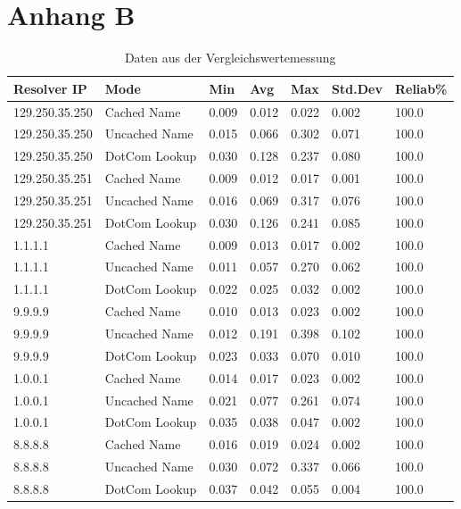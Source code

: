 \chapter{Anhang B}
\label{chap:appB}

\begin{table}[]
\caption{Daten aus der Vergleichswertemessung}
\begin{tabular}{lllllll}
\hline
Resolver IP    & Mode          & Min   & Avg   & Max   & Std.Dev & Reliab\% \\ \hline
129.250.35.250 & Cached Name   & 0.009 & 0.012 & 0.022 & 0.002   & 100.0    \\
129.250.35.250 & Uncached Name & 0.015 & 0.066 & 0.302 & 0.071   & 100.0    \\
129.250.35.250 & DotCom Lookup & 0.030 & 0.128 & 0.237 & 0.080   & 100.0    \\
129.250.35.251 & Cached Name   & 0.009 & 0.012 & 0.017 & 0.001   & 100.0    \\
129.250.35.251 & Uncached Name & 0.016 & 0.069 & 0.317 & 0.076   & 100.0    \\
129.250.35.251 & DotCom Lookup & 0.030 & 0.126 & 0.241 & 0.085   & 100.0    \\
1.1.1.1        & Cached Name   & 0.009 & 0.013 & 0.017 & 0.002   & 100.0    \\
1.1.1.1        & Uncached Name & 0.011 & 0.057 & 0.270 & 0.062   & 100.0    \\
1.1.1.1        & DotCom Lookup & 0.022 & 0.025 & 0.032 & 0.002   & 100.0    \\
9.9.9.9        & Cached Name   & 0.010 & 0.013 & 0.023 & 0.002   & 100.0    \\
9.9.9.9        & Uncached Name & 0.012 & 0.191 & 0.398 & 0.102   & 100.0    \\
9.9.9.9        & DotCom Lookup & 0.023 & 0.033 & 0.070 & 0.010   & 100.0    \\
1.0.0.1        & Cached Name   & 0.014 & 0.017 & 0.023 & 0.002   & 100.0    \\
1.0.0.1        & Uncached Name & 0.021 & 0.077 & 0.261 & 0.074   & 100.0    \\
1.0.0.1        & DotCom Lookup & 0.035 & 0.038 & 0.047 & 0.002   & 100.0    \\
8.8.8.8        & Cached Name   & 0.016 & 0.019 & 0.024 & 0.002   & 100.0    \\
8.8.8.8        & Uncached Name & 0.030 & 0.072 & 0.337 & 0.066   & 100.0    \\
8.8.8.8        & DotCom Lookup & 0.037 & 0.042 & 0.055 & 0.004   & 100.0    \\

\end{tabular}
\end{table}
